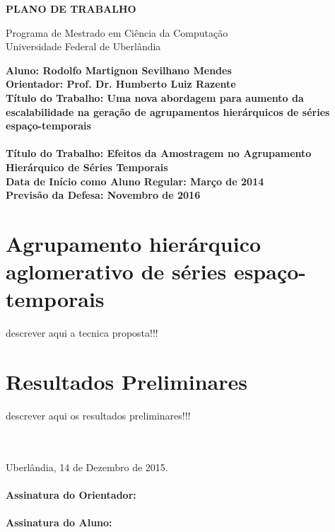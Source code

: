 \documentclass[12pt]{article}
\begin{document}
\begin{center}
    \bf{
        \LARGE{PLANO DE TRABALHO}
        \\ $\ $\\
    }
    
    \Large{
        Programa de Mestrado em Ciência da Computação\\
        Universidade Federal de Uberlândia
    }
    \\ $\ $\\
\end{center}

\begin{center}
    \bf{
        Aluno: Rodolfo Martignon Sevilhano Mendes\\ $\ $\\
        Orientador: Prof. Dr. Humberto Luiz Razente\\ $\ $\\
        Título do Trabalho: Uma nova abordagem para aumento da escalabilidade na geração de agrupamentos hierárquicos de séries espaço-temporais\\ \ \ \\
        Título do Trabalho: Efeitos da Amostragem no Agrupamento \\ Hierárquico de Séries Temporais\\ $\ $\\
        Data de Início como Aluno Regular: Março de 2014\\ $\ $\\
        Previsão da Defesa: Novembro de 2016\\ $\ $\\
    }
\end{center}






\section{Agrupamento hierárquico aglomerativo de séries espaço-temporais}

descrever aqui a tecnica proposta!!!

\section{Resultados Preliminares}

descrever aqui os resultados preliminares!!!





\ \\
\ \\
\noindent Uberlândia, 14 de Dezembro de 2015.\\

\ \\
\noindent \textbf{Assinatura do Orientador:} \\

\ \\
\noindent \textbf{Assinatura do Aluno:}


\end{document}
